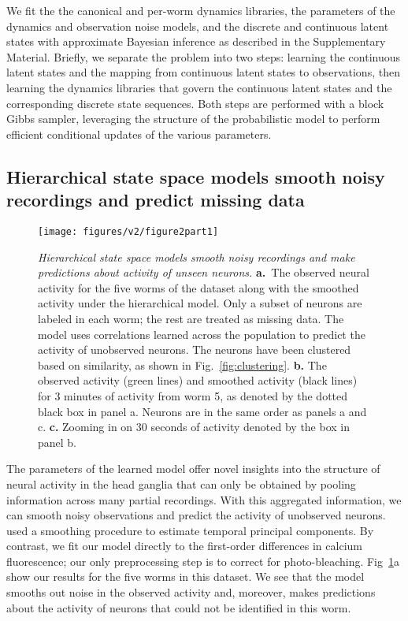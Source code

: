 \documentclass[11pt]{article}
\begin{document}
We fit the the canonical and per-worm dynamics libraries, the
parameters of the dynamics and observation noise models, and the
discrete and continuous latent states with approximate Bayesian
inference as described in the Supplementary Material. Briefly, we
separate the problem into two steps: learning the continuous latent
states and the mapping from continuous latent states to observations,
then learning the dynamics libraries that govern the continuous latent
states and the corresponding discrete state sequences.  Both steps are
performed with a block Gibbs sampler, leveraging the structure of the
probabilistic model to perform efficient conditional updates of the
various parameters. 

\subsection*{Hierarchical state space models smooth noisy recordings and predict missing data}

\begin{figure}[t!]
\centering
\texttt{[image: figures/v2/figure2part1]} 
\caption{ \textit{Hierarchical state space models smooth noisy recordings and
  make predictions about activity of unseen neurons.}
  \textbf{a.}~The observed neural activity for the
  five worms of the \citet{kato2015global} dataset along with the
  smoothed activity under the hierarchical model.  Only a subset of neurons
  are labeled in each worm; the rest are treated as missing data.
  The model uses correlations learned across the population to predict the activity
  of unobserved neurons.
  The neurons have been clustered based on similarity, as shown in Fig.~\ref{fig:clustering}.
  \textbf{b.} The observed activity (green lines) and smoothed activity (black lines)
  for 3 minutes of activity from worm 5, as denoted by the dotted black box in panel a.
  Neurons are in the same order as panels a and c.
  \textbf{c.} Zooming in on 30 seconds of activity denoted by the box in panel b.
}
\label{fig:smoothing}
\end{figure}


The parameters of the learned model offer novel insights into the
structure of neural activity in the head ganglia that can only be
obtained by pooling information across many partial recordings.  With
this aggregated information, we can smooth noisy observations and
predict the activity of unobserved neurons. \citet{kato2015global}
used a smoothing procedure to estimate temporal principal components.
By contrast, we fit our model directly to the first-order differences
in calcium fluorescence; our only preprocessing step is to correct for
photo-bleaching. Fig~\ref{fig:smoothing}a show our results for the 
five worms in this dataset. We see that the model smooths out
noise in the observed activity and, moreover, makes predictions about
the activity of neurons that could not be identified in this worm.
\end{document}
